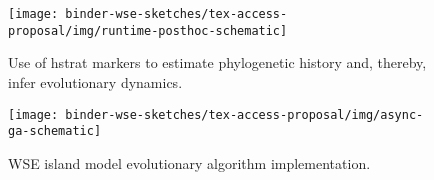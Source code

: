 \begin{figure*}
  \centering
  \begin{subfigure}[t]{0.43\linewidth}
    \centering
  \texttt{[image: binder-wse-sketches/tex-access-proposal/img/runtime-posthoc-schematic]}
    \caption{%
    Use of hstrat markers to estimate phylogenetic history and, thereby, infer evolutionary dynamics.
    }
    \label{fig:runtime-posthoc-schematic}
  \end{subfigure}
  \hspace{0.07\linewidth}
  \begin{subfigure}[t]{0.43\linewidth}
    \centering
  \texttt{[image: binder-wse-sketches/tex-access-proposal/img/async-ga-schematic]}
    \caption{WSE island model evolutionary algorithm implementation.}
    \label{fig:async-ga-schematic}
  \end{subfigure}

\caption{%
\textbf{Methods for distributed evolution simulation.}
Subfigure \ref{fig:runtime-posthoc-schematic} shows use of hstrat markers to for reconstruct-based phylogenetic tracking of highly-distributed evolution simulations.
Subfigure \ref{fig:async-ga-schematic} summarizes asynchronous, callback-based approach to population exchange (``migration''') used to instantiate evolving populations across WSE PEs.
}
\label{fig:schematic}

\end{figure*}
